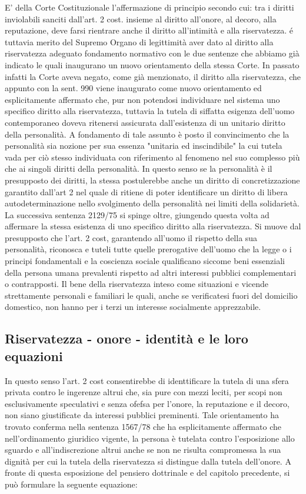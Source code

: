 E' della Corte Costituzionale l'affermazione di principio secondo cui: tra i diritti inviolabili sanciti dall'art. 2 cost. insieme al diritto all'onore, al decoro, alla reputazione, deve farsi rientrare anche il diritto all'intimità e alla riservatezza. é tuttavia merito del Supremo Organo di legittimità aver dato al diritto alla riservatezza adeguato fondamento normativo con le due sentenze che abbiamo già indicato le quali inaugurano un nuovo orientamento della stessa Corte.
In passato infatti la Corte aveva negato, come già menzionato, il diritto alla riservatezza, che appunto con la sent. 990 viene inaugurato come nuovo orientamento ed esplicitamente affermato che, pur non potendosi individuare nel sistema uno specifico diritto alla riservatezza, tuttavia la tutela di siffatta esigenza dell'uomo contemporaneo doveva ritenersi assicurata dall'esistenza di un unitario diritto della personalità. A fondamento di tale assunto è posto il convincimento che la personalità sia nozione per sua essenza "unitaria ed inscindibile" la cui tutela vada per ciò stesso individuata con riferimento al fenomeno nel suo complesso più che ai singoli diritti della personalità. 
In questo senso se la personalità è il presupposto dei diritti, la stessa postulerebbe anche un diritto di concretizzazione garantito dall'art 2 nel quale di ritiene di poter identificare un diritto di libera autodeterminazione nello svolgimento della personalità nei limiti della solidarietà.
La successiva sentenza 2129/75 si spinge oltre, giungendo questa volta ad affermare la stessa esistenza di uno specifico diritto alla riservatezza.
Si muove dal presupposto che l'art. 2 cost, garantendo all'uomo il rispetto della sua personalità, riconosca e tuteli tutte quelle prerogative dell'uomo che la legge o i principi fondamentali e la coscienza sociale qualificano siccome beni essenziali della persona umana prevalenti rispetto ad altri interessi pubblici complementari o contrapposti. Il bene della riservatezza inteso come situazioni e vicende strettamente personali e familiari le quali, anche se verificatesi fuori del domicilio domestico, non hanno per i terzi un interesse socialmente apprezzabile.

\subsection{Riservatezza - onore - identità e le loro equazioni}In questo senso l'art. 2 cost consentirebbe di identtificare la tutela di una sfera privata contro le ingerenze altrui che, sia pure con mezzi leciti, per scopi non esclusivamente speculativi e senza ofefsa per l'onore, la reputazione e il decoro, non siano giustificate da interessi pubblici preminenti.
Tale orientamento ha trovato conferma nella sentenza 1567/78 che ha esplicitamente affermato che nell'ordinamento giuridico vigente, la persona  è tutelata contro l'esposizione allo sguardo e all'indiscrezione altrui anche se non ne risulta compromessa la sua dignità per cui la tutela della riservatezza si distingue dalla tutela dell'onore.
A fronte di questa esposizione del pensiero dottrinale e del capitolo precedente, si può formulare la seguente equazione:

